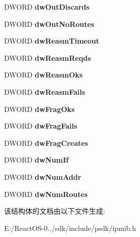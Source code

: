 \begin{DoxyCompactItemize}
D\+W\+O\+RD {\bfseries dw\+Out\+Discards}
\item 
\mbox{\label{struct___m_i_b___i_p_s_t_a_t_s_a4f8cecb27354c40fcea7f992240cad4d}} 
D\+W\+O\+RD {\bfseries dw\+Out\+No\+Routes}
\item 
\mbox{\label{struct___m_i_b___i_p_s_t_a_t_s_a992430ab52820a9534705739bd676930}} 
D\+W\+O\+RD {\bfseries dw\+Reasm\+Timeout}
\item 
\mbox{\label{struct___m_i_b___i_p_s_t_a_t_s_a6a88ba3d45217f939d184296a4e8ff6a}} 
D\+W\+O\+RD {\bfseries dw\+Reasm\+Reqds}
\item 
\mbox{\label{struct___m_i_b___i_p_s_t_a_t_s_a212fc3a57ca5781d2988c9f573b551f8}} 
D\+W\+O\+RD {\bfseries dw\+Reasm\+Oks}
\item 
\mbox{\label{struct___m_i_b___i_p_s_t_a_t_s_ae55b49e7e029778cc25f797c748eaefb}} 
D\+W\+O\+RD {\bfseries dw\+Reasm\+Fails}
\item 
\mbox{\label{struct___m_i_b___i_p_s_t_a_t_s_a100f6ad4c91f5e11431526d02ad9c40d}} 
D\+W\+O\+RD {\bfseries dw\+Frag\+Oks}
\item 
\mbox{\label{struct___m_i_b___i_p_s_t_a_t_s_af4eea461b0505bc7a4860b33885f8e8f}} 
D\+W\+O\+RD {\bfseries dw\+Frag\+Fails}
\item 
\mbox{\label{struct___m_i_b___i_p_s_t_a_t_s_abb4454289c1f0b763b69bba791347aec}} 
D\+W\+O\+RD {\bfseries dw\+Frag\+Creates}
\item 
\mbox{\label{struct___m_i_b___i_p_s_t_a_t_s_a573c9bcbf5f6be50ec53d5b3b49ed87f}} 
D\+W\+O\+RD {\bfseries dw\+Num\+If}
\item 
\mbox{\label{struct___m_i_b___i_p_s_t_a_t_s_a94e171721a104c8fdbf4383469767391}} 
D\+W\+O\+RD {\bfseries dw\+Num\+Addr}
\item 
\mbox{\label{struct___m_i_b___i_p_s_t_a_t_s_aa60034bf17f6acc77ff77f01c8286ca8}} 
D\+W\+O\+RD {\bfseries dw\+Num\+Routes}
\end{DoxyCompactItemize}


该结构体的文档由以下文件生成\+:\begin{DoxyCompactItemize}
\item 
E\+:/\+React\+O\+S-\/0../sdk/include/psdk/ipmib.\+h\end{DoxyCompactItemize}
